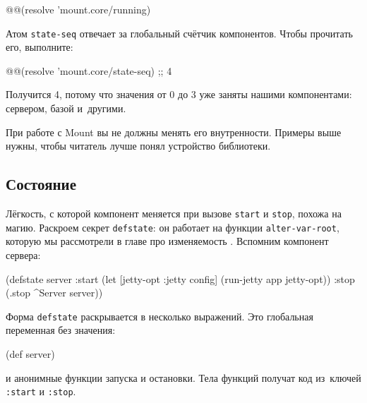 \begin{english}
  \begin{clojure}
@@(resolve 'mount.core/running)
  \end{clojure}
\end{english}

Атом \verb|state-seq| отвечает за глобальный счётчик компонентов. Чтобы
прочитать его, выполните:

\begin{english}
  \begin{clojure}
@@(resolve 'mount.core/state-seq) ;; 4
  \end{clojure}
\end{english}

\noindent
Получится 4, потому что значения от 0 до 3 уже заняты нашими компонентами:
сервером, базой и~другими.

При работе с Mount вы не должны менять его внутренности. Примеры выше нужны,
чтобы читатель лучше понял устройство библиотеки.

\subsection{Состояние}


Лёгкость, с которой компонент меняется при вызове \verb|start| и
\verb|stop|, похожа на магию. Раскроем секрет \verb|defstate|: он работает на
функции \verb|alter-var-root|, которую мы рассмотрели в главе про
изменяемость . Вспомним компонент сервера:

\begin{english}
  \begin{clojure}
(defstate server
  :start
  (let [{jetty-opt :jetty} config]
    (run-jetty app jetty-opt))
  :stop
  (.stop ^Server server))
  \end{clojure}
\end{english}

Форма \verb|defstate| раскрывается в несколько выражений. Это глобальная
переменная без значения:


\begin{english}
  \begin{clojure}
(def server)
  \end{clojure}
\end{english}

\noindent
и анонимные функции запуска и остановки. Тела функций получат код из~ключей
\verb|:start| и \verb|:stop|.

